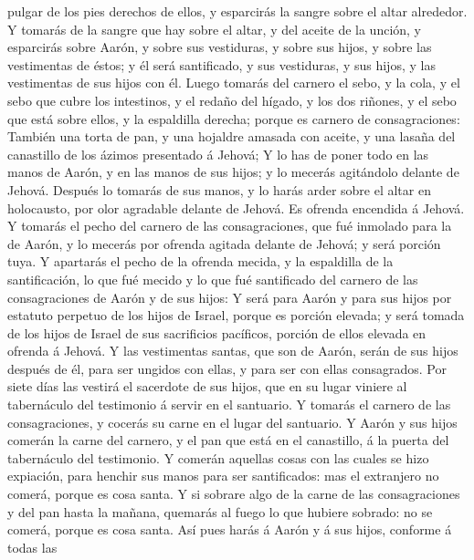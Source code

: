 pulgar de los pies derechos de ellos, y esparcirás la sangre sobre el
altar alrededor.  Y tomarás de la sangre que hay sobre el
altar, y del aceite de la unción, y esparcirás sobre Aarón, y sobre sus
vestiduras, y sobre sus hijos, y sobre las vestimentas de éstos; y él
será santificado, y sus vestiduras, y sus hijos, y las vestimentas de
sus hijos con él.  Luego tomarás del carnero el sebo, y la
cola, y el sebo que cubre los intestinos, y el redaño del hígado, y los
dos riñones, y el sebo que está sobre ellos, y la espaldilla derecha;
porque es carnero de consagraciones:  También una torta de
pan, y una hojaldre amasada con aceite, y una lasaña del canastillo de
los ázimos presentado á Jehová;  Y lo has de poner todo en
las manos de Aarón, y en las manos de sus hijos; y lo mecerás agitándolo
delante de Jehová.  Después lo tomarás de sus manos, y lo
harás arder sobre el altar en holocausto, por olor agradable delante de
Jehová. Es ofrenda encendida á Jehová.  Y tomarás el pecho
del carnero de las consagraciones, que fué inmolado para la de Aarón, y
lo mecerás por ofrenda agitada delante de Jehová; y será porción tuya.
 Y apartarás el pecho de la ofrenda mecida, y la espaldilla
de la santificación, lo que fué mecido y lo que fué santificado del
carnero de las consagraciones de Aarón y de sus hijos:  Y
será para Aarón y para sus hijos por estatuto perpetuo de los hijos de
Israel, porque es porción elevada; y será tomada de los hijos de Israel
de sus sacrificios pacíficos, porción de ellos elevada en ofrenda á
Jehová.  Y las vestimentas santas, que son de Aarón, serán
de sus hijos después de él, para ser ungidos con ellas, y para ser con
ellas consagrados.  Por siete días las vestirá el sacerdote
de sus hijos, que en su lugar viniere al tabernáculo del testimonio á
servir en el santuario.  Y tomarás el carnero de las
consagraciones, y cocerás su carne en el lugar del santuario.
 Y Aarón y sus hijos comerán la carne del carnero, y el pan
que está en el canastillo, á la puerta del tabernáculo del testimonio.
 Y comerán aquellas cosas con las cuales se hizo expiación,
para henchir sus manos para ser santificados: mas el extranjero no
comerá, porque es cosa santa.  Y si sobrare algo de la
carne de las consagraciones y del pan hasta la mañana, quemarás al fuego
lo que hubiere sobrado: no se comerá, porque es cosa santa.
 Así pues harás á Aarón y á sus hijos, conforme á todas las
